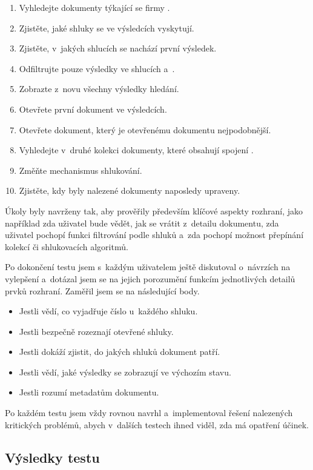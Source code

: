 \begin{enumerate}
\item Vyhledejte dokumenty týkající se firmy .
\item Zjistěte, jaké shluky se ve výsledcích vyskytují.
\item Zjistěte, v~jakých shlucích se nachází první výsledek.
\item \label{task_clusterfilter}Odfiltrujte pouze výsledky ve shlucích  a~.
\item Zobrazte z~novu všechny výsledky hledání.
\item Otevřete první dokument ve výsledcích.
\item Otevřete dokument, který je otevřenému dokumentu nejpodobnější.
\item Vyhledejte v~druhé kolekci dokumenty, které obsahují spojení .
\item \label{task_engine}Změňte mechanismus shlukování.
\item Zjistěte, kdy byly nalezené dokumenty naposledy upraveny.
\end{enumerate}

Úkoly byly navrženy tak, aby prověřily především klíčové aspekty rozhraní, jako například zda uživatel bude vědět, jak se vrátit z~detailu dokumentu, zda uživatel pochopí funkci filtrování podle shluků a~zda pochopí možnost přepínání kolekcí či shlukovacích algoritmů.

Po dokončení testu jsem s~každým uživatelem ještě diskutoval o~návrzích na vylepšení a~dotázal jsem se na jejich porozumění funkcím jednotlivých detailů prvků rozhraní. Zaměřil jsem se na následující body.

\begin{itemize}
\item Jestli vědí, co vyjadřuje číslo u~každého shluku.
\item Jestli bezpečně rozeznají otevřené shluky.
\item Jestli dokáží zjistit, do jakých shluků dokument patří.
\item Jestli vědí, jaké výsledky se zobrazují ve výchozím stavu.
\item Jestli rozumí metadatům dokumentu.
\end{itemize}

Po každém testu jsem vždy rovnou navrhl a~implementoval řešení nalezených kritických problémů, abych v~dalších testech ihned viděl, zda má opatření účinek.

\subsection{Výsledky testu}
